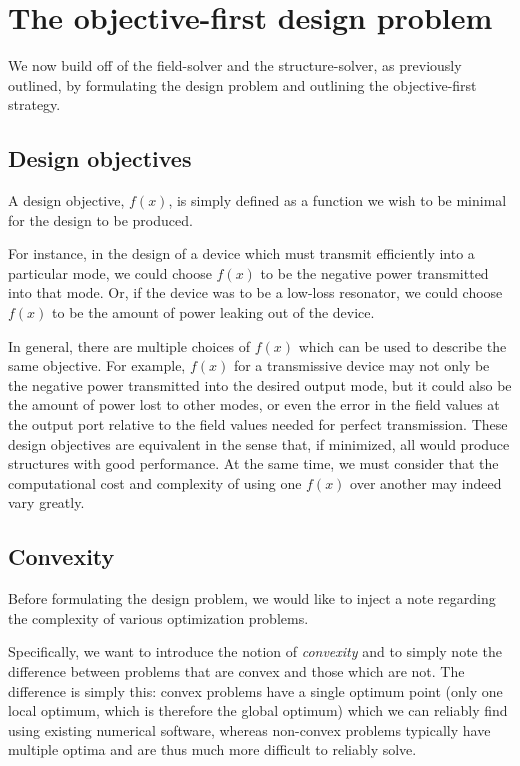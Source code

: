 
\section{The objective-first design problem}
We now build off of the field-solver and the structure-solver,
    as previously outlined,
    by formulating the design problem
    and outlining the objective-first strategy.

\subsection{Design objectives}
A design objective, $f(x)$, is simply defined as
    a function we wish to be minimal 
    for the design to be produced.

For instance, in the design of a device
    which must transmit efficiently into a particular mode,
    we could choose $f(x)$ to be the negative power transmitted into that mode.
Or, if the device was to be a low-loss resonator,
    we could choose $f(x)$ to be the amount of power leaking 
    out of the device.

In general, there are multiple choices of $f(x)$
    which can be used to describe the same objective.
For example, $f(x)$ for a transmissive device 
    may not only be the negative power transmitted into the desired output mode,
    but it could also be the amount of power lost to other modes,
    or even the error in the field values at the output port
    relative to the field values needed for perfect transmission.
These design objectives are equivalent in the sense that, if minimized, 
    all would produce structures with good performance.
At the same time, we must consider that the computational cost and complexity
    of using one $f(x)$ over another may indeed vary greatly.

\subsection{Convexity}
Before formulating the design problem,
    we would like to inject a note regarding the complexity of various 
    optimization problems.

Specifically, we want to introduce the notion of \emph{convexity} %
    and to simply note the difference between problems that
    are convex and those which are not.
The difference is simply this:
    convex problems have a single optimum point
    (only one local optimum, which is therefore the global optimum)
    which we can reliably find using existing numerical software,
    whereas non-convex problems typically have multiple optima 
    and are thus much more difficult to reliably solve.


